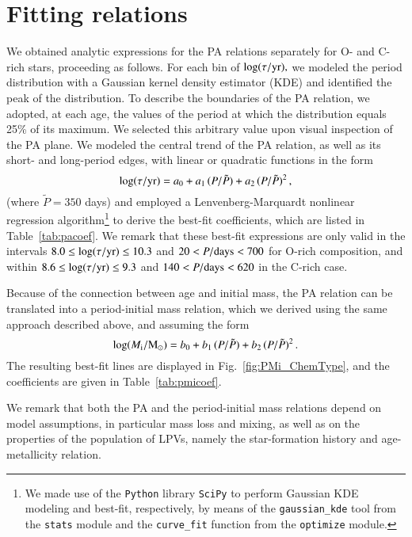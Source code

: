 \documentclass[letter]{aa}
\newcommand{\Msun}{{\rm M}_{\odot}}
\newcommand{\logAge}{\log(\tau / {\rm yr})}
\newcommand{\Mini}{M_{\rm i}}
\begin{document}
\section{Fitting relations}
\label{asec:FittingRelations}

We obtained analytic expressions for the PA relations separately for O- and C-rich stars, proceeding as follows. For each bin of $\logAge,$ we modeled the period distribution with a Gaussian kernel density estimator (KDE) and identified the peak of the distribution. To describe the boundaries of the PA relation, we adopted, at each age, the values of the period at which the distribution equals 25\% of its maximum. We selected this arbitrary value upon visual inspection of the PA plane. We modeled the central trend of the PA relation, as well as its short- and long-period edges, with linear or quadratic functions in the form
\begin{equation}\label{eq:pafit}
    \logAge = a_0 + a_1\,(P/\tilde{P})+a_2\,(P/\tilde{P})^2\,,
\end{equation}
(where $\tilde{P}=350$ days) and employed a Lenvenberg-Marquardt nonlinear regression algorithm\footnote{
    We made use of the \texttt{Python} library \texttt{SciPy} to perform Gaussian KDE modeling and best-fit, respectively, by means of the \texttt{gaussian\_kde} tool from the \texttt{stats} module and the \texttt{curve\_fit} function from the \texttt{optimize} module.
} to derive the best-fit coefficients, which are listed in Table~\ref{tab:pacoef}. We remark that these best-fit expressions are only valid in the intervals $8.0\leq\logAge\leq10.3$ and $20<P/{\rm days}<700$ for O-rich composition, and within $8.6\leq\logAge\leq9.3$ and $140<P/{\rm days}<620$ in the C-rich case.

Because of the connection between age and initial mass, the PA relation can be translated into a period-initial mass relation, which we derived using the same approach described above, and assuming the form
\begin{equation}\label{eq:pmifit}
    \log(\Mini/\Msun) = b_0 + b_1\,(P/\tilde{P})+b_2\,(P/\tilde{P})^2\,.
\end{equation}
The resulting best-fit lines are displayed in Fig.~\ref{fig:PMi_ChemType}, and the coefficients are given in Table~\ref{tab:pmicoef}.

We remark that both the PA and the period-initial mass relations depend on model assumptions, in particular mass loss and mixing, as well as on the properties of the population of LPVs, namely the star-formation history and age-metallicity relation.
\end{document}
